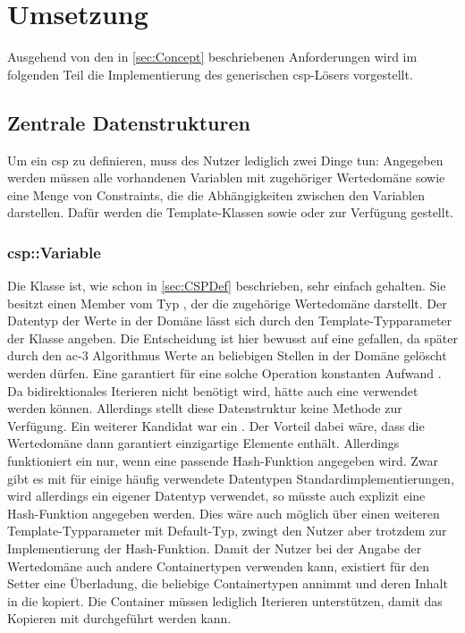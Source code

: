\section{Umsetzung}
Ausgehend von den in \cref{sec:Concept} beschriebenen Anforderungen wird im folgenden Teil die Implementierung des generischen \ac*{csp}-Lösers vorgestellt.

\subsection{Zentrale Datenstrukturen}
Um ein \ac*{csp} zu definieren, muss des Nutzer lediglich zwei Dinge tun: Angegeben werden müssen alle vorhandenen Variablen mit zugehöriger Wertedomäne sowie eine Menge von
Constraints, die die Abhängigkeiten zwischen den Variablen darstellen. Dafür werden die Template-Klassen  sowie  oder
 zur Verfügung gestellt.

\subsubsection{csp::Variable}
Die Klasse  ist, wie schon in \cref{sec:CSPDef} beschrieben, sehr einfach gehalten. Sie besitzt einen Member vom Typ , der die zugehörige
Wertedomäne darstellt. Der Datentyp der Werte in der Domäne lässt sich durch den Template-Typparameter der Klasse angeben. Die Entscheidung ist hier bewusst auf eine
 gefallen, da später durch den \ac*{ac}-3 Algorithmus Werte an beliebigen Stellen in der Domäne gelöscht werden dürfen. Eine  garantiert für
eine solche Operation konstanten Aufwand \cite{stdList}. Da bidirektionales Iterieren nicht benötigt wird, hätte auch eine  verwendet werden können.
Allerdings stellt diese Datenstruktur keine Methode  zur Verfügung. Ein weiterer Kandidat war ein . Der Vorteil dabei wäre, dass die
Wertedomäne dann garantiert einzigartige Elemente enthält. Allerdings funktioniert ein  nur, wenn eine passende Hash-Funktion angegeben wird. Zwar gibt
es mit  für einige häufig verwendete Datentypen Standardimplementierungen, wird allerdings ein eigener Datentyp verwendet, so müsste auch explizit eine
Hash-Funktion angegeben werden. Dies wäre auch möglich über einen weiteren Template-Typparameter mit Default-Typ, zwingt den Nutzer aber trotzdem zur Implementierung der
Hash-Funktion. Damit der Nutzer bei der Angabe der Wertedomäne auch andere Containertypen verwenden kann, existiert für den Setter  eine Überladung, die
beliebige Containertypen annimmt und deren Inhalt in die  kopiert. Die Container müssen lediglich Iterieren unterstützen, damit das Kopieren mit
 durchgeführt werden kann.

